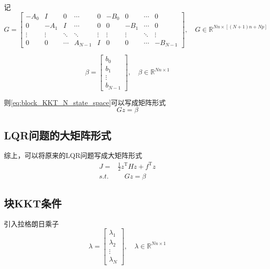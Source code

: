 \documentclass[withoutpreface,bwprint]{NoteBook}
\begin{document}
记
\begin{equation}
\label{eq:block_KKT_G}
G = \begin{bmatrix}
-A_0 & I 	& 0 & \cdots & 0 & -B_0 & 0    & \cdots & 0 \\
0 	 & -A_1 & I & \cdots & 0 & 0 	& -B_1 & \cdots & 0 \\
\vdots & \vdots & \ddots & \ddots & \vdots & \vdots & \vdots & \ddots & \vdots \\
0 	 & 0 & \cdots & A_{N-1} & I & 0 & 0 & \cdots & -B_{N-1}
\end{bmatrix}
,\quad G \in \mathbb{R}^{Nn \times [(N+1)n+Np]}
\end{equation}

\begin{equation}
\label{eq:block_KKT_beta}
\beta = \begin{bmatrix}
b_0 \\ b_1 \\ \vdots \\b_{N-1}
\end{bmatrix}
,\quad \beta \in \mathbb{R}^{Nn \times 1}
\end{equation}


则\cref{eq:block_KKT_N_state_space}可以写成矩阵形式
\begin{equation}
\label{eq:block_KKT_constrains_big_type}
G z = \beta
\end{equation}

\subsection{LQR问题的大矩阵形式}

综上，可以将原来的LQR问题写成大矩阵形式
\begin{equation}
\label{eq:block_KKT_LQR_problem_big_matrix_type}
\begin{aligned}
J =& \frac{1}{2} z^\mathrm{T} H z + f^\mathrm{T}z \\
s.t.& \quad G z = \beta
\end{aligned}
\end{equation}

\subsection{块KKT条件}

引入拉格朗日乘子
\begin{equation}
\label{eq:block_KKT_lambda}
\lambda = \begin{bmatrix}
\lambda_1 \\ \lambda_2 \\\vdots \\ \lambda_{N}
\end{bmatrix}
,\quad \lambda \in \mathbb{R}^{Nn \times 1}
\end{equation}
\end{document}
